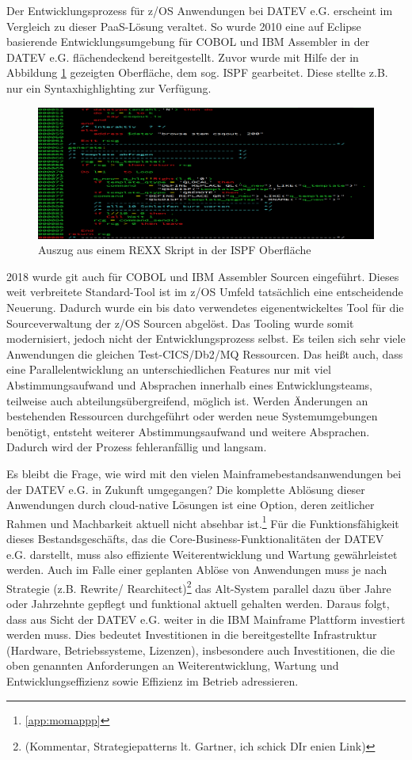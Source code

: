 Der Entwicklungsprozess für z/OS Anwendungen bei DATEV e.G. erscheint im Vergleich zu dieser PaaS-Lösung veraltet.
So wurde 2010 eine auf Eclipse basierende Entwicklungsumgebung für COBOL und IBM Assembler in der DATEV e.G. flächendeckend bereitgestellt.
Zuvor wurde mit Hilfe der in Abbildung \ref{fig:3270} gezeigten Oberfläche, dem sog. ISPF gearbeitet.
Diese stellte z.B. nur ein Syntaxhighlighting zur Verfügung.
\begin{figure}[h]
\centering
\includegraphics[width=\textwidth]{figures/rexxintso.png}
\caption{Auszug aus einem REXX Skript in der ISPF Oberfläche}
\label{fig:3270}
\end{figure}
2018 wurde git auch für COBOL und IBM Assembler Sourcen eingeführt.
Dieses weit verbreitete Standard-Tool ist im z/OS Umfeld tatsächlich eine entscheidende Neuerung.
Dadurch wurde ein bis dato verwendetes eigenentwickeltes Tool für die Sourceverwaltung der z/OS Sourcen abgelöst.
Das Tooling wurde somit modernisiert, jedoch nicht der Entwicklungsprozess selbst.
Es teilen sich sehr viele Anwendungen die gleichen Test-CICS/Db2/MQ Ressourcen.
Das heißt auch, dass eine Parallelentwicklung an unterschiedlichen Features nur mit viel Abstimmungsaufwand und Absprachen innerhalb eines Entwicklungsteams, teilweise auch abteilungsübergreifend, möglich ist.
Werden Änderungen an bestehenden Ressourcen durchgeführt oder werden neue Systemumgebungen benötigt, entsteht weiterer Abstimmungsaufwand und weitere Absprachen.
Dadurch wird der Prozess fehleranfällig und langsam.

Es bleibt die Frage, wie wird mit den vielen Mainframebestandsanwendungen bei der DATEV e.G. in Zukunft umgegangen?
Die komplette Ablösung dieser Anwendungen durch cloud-native Lösungen ist eine Option, deren zeitlicher Rahmen und Machbarkeit aktuell nicht absehbar ist.\footnote{\ref{app:momappp} }
Für die Funktionsfähigkeit dieses Bestandsgeschäfts, das die Core-Business-Funktionalitäten der DATEV e.G. darstellt, muss also effiziente Weiterentwicklung und Wartung gewährleistet werden.
Auch im Falle einer geplanten Ablöse von Anwendungen muss je nach Strategie (z.B. \glqq Rewrite\grqq / \glqq Rearchitect\grqq)\footnote{(Kommentar, Strategiepatterns lt. Gartner, ich schick DIr enien Link)} das Alt-System parallel dazu über Jahre oder Jahrzehnte gepflegt und funktional aktuell gehalten werden.
Daraus folgt, dass aus Sicht der DATEV e.G. weiter in die IBM Mainframe Plattform investiert werden muss. 
Dies bedeutet Investitionen in die bereitgestellte Infrastruktur (Hardware, Betriebssysteme, Lizenzen), insbesondere auch Investitionen, die die oben genannten Anforderungen an Weiterentwicklung, Wartung und Entwicklungseffizienz sowie Effizienz im Betrieb adressieren.

